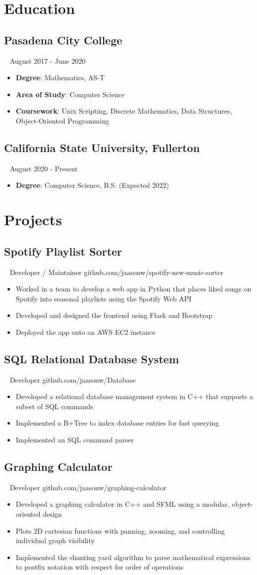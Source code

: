 \documentclass{article}
\newcommand{\resumesection}[3]{
    \subsection*{#1}
    \ 
    \footnotesize
    \textcolor{csufgrey}{#2}
    \footnotesize
    \hfill
    \textcolor{csufgrey}{#3}
    \normalsize
}
\begin{document}
\pagestyle{useheader}

\section*{Education}
\resumesection{Pasadena City College}{}{August 2017 - June 2020}
\begin{itemize}
    \item \textbf{Degree}: Mathematics, AS-T
    \item \textbf{Area of Study}: Computer Science
    \item \textbf{Coursework}: Unix Scripting, Discrete Mathematics, Data Structures, Object-Oriented Programming
\end{itemize}

\resumesection{California State University, Fullerton}{}{August 2020 - Present}
\begin{itemize}
    \item \textbf{Degree}: Computer Science, B.S. (Expected 2022)
\end{itemize}
\hfill
\section*{Projects}
\resumesection{Spotify Playlist Sorter}{Developer / Maintainer}{github.com/jaasonw/spotify-new-music-sorter}
\begin{itemize}
    \item Worked in a team to develop a web app in Python that places liked songs on Spotify into seasonal playlists using the Spotify Web API
    \item Developed and designed the frontend using Flask and Bootstrap
    \item Deployed the app onto an AWS EC2 instance
\end{itemize}

\resumesection{SQL Relational Database System}{Developer}{github.com/jaasonw/Database}
\begin{itemize}
    \item Developed a relational database management system in C++ that supports a subset of SQL commands
    \item Implemented a B+Tree to index database entries for fast querying
    \item Implemented an SQL command parser
\end{itemize}

\resumesection{Graphing Calculator}{Developer}{github.com/jaasonw/graphing-calculator}
\begin{itemize}
    \item Developed a graphing calculator in C++ and SFML using a modular, object-oriented design
    \item Plots 2D cartesian functions with panning, zooming, and controlling individual graph visibility
    \item Implemented the shunting yard algorithm to parse mathematical expressions to postfix notation with respect for order of operations
\end{itemize}
\end{document}
